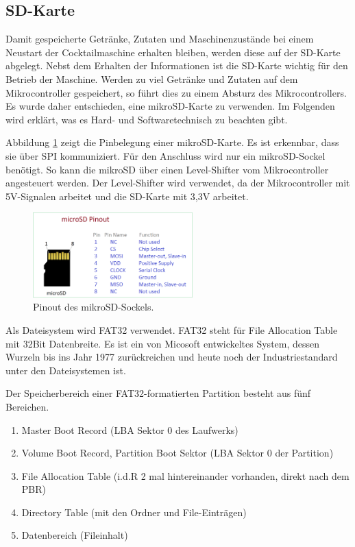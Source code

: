 \subsection{SD-Karte}
\label{subsec:SD-Karte}

Damit gespeicherte Getränke, Zutaten und Maschinenzustände bei einem Neustart der Cocktailmaschine erhalten bleiben, werden diese auf der SD-Karte abgelegt. Nebst dem Erhalten der Informationen ist die SD-Karte wichtig für den Betrieb der Maschine. Werden zu viel Getränke und Zutaten auf dem Mikrocontroller gespeichert, so führt dies zu einem Absturz des Mikrocontrollers. Es wurde daher entschieden, eine mikroSD-Karte zu verwenden. Im Folgenden wird erklärt, was es Hard- und Softwaretechnisch zu beachten gibt.

Abbildung \ref{fig:micro_sd_pinout} zeigt die Pinbelegung einer mikroSD-Karte. Es ist erkennbar, dass sie über SPI kommuniziert. Für den Anschluss wird nur ein mikroSD-Sockel benötigt. So kann die mikroSD über einen Level-Shifter vom Mikrocontroller angesteuert werden. Der Level-Shifter wird verwendet, da der Mikrocontroller mit 5V-Signalen arbeitet und die SD-Karte mit 3,3V arbeitet.

\begin{figure}[H]
	\centering
	\includegraphics[width=0.55\textwidth]{graphics/micro-sd-pinout}
	\caption{Pinout des mikroSD-Sockels. \cite{theorycircuitcom_arduino_2018}}
	\label{fig:micro_sd_pinout}
\end{figure}

Als Dateisystem wird FAT32 verwendet. FAT32 steht für File Allocation Table mit 32Bit Datenbreite. Es ist ein von Micosoft entwickeltes System, dessen Wurzeln bis ins Jahr 1977 zurückreichen und heute noch der Industriestandard unter den Dateisystemen ist. \cite{ionosde_fat32_2020}

Der Speicherbereich einer FAT32-formatierten Partition besteht aus fünf Bereichen. \cite{milsch_aufbau_2009}
\begin{enumerate}
\item Master Boot Record (LBA Sektor 0 des Laufwerks)
\item Volume Boot Record, Partition Boot Sektor (LBA Sektor 0 der Partition)
\item File Allocation Table (i.d.R 2 mal hintereinander vorhanden, direkt nach dem PBR)
\item Directory Table (mit den Ordner und File-Einträgen)
\item Datenbereich (Fileinhalt)
\end{enumerate}

